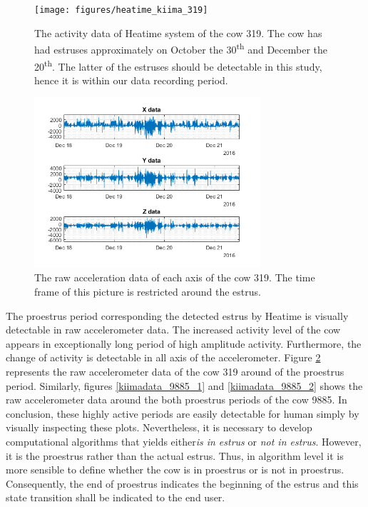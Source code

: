 \documentclass[english,12pt,a4paper,pdftex,elec,utf8]{aaltothesis}
\begin{document}
\begin{figure}[h]
\centering
\texttt{[image: figures/heatime\_kiima\_319]}
\caption{The activity data of Heatime system of the cow 319. The cow has had estruses approximately on October the 30\textsuperscript{th} and December the 20\textsuperscript{th}. The latter of the estruses should be detectable in this study, hence it is within our data recording period.}
\label{heatime_kiima_319}
\end{figure}

\begin{figure}[h]
\centering
\includegraphics[width = 0.75\textwidth]{figures/kiimadata_319.png}
\caption{The raw acceleration data of each axis of the cow 319. The time frame of this picture is restricted around the estrus.}
\label{kiimadata_319}
\end{figure}



The proestrus period corresponding the detected estrus by Heatime is visually detectable in raw accelerometer data. The increased activity level of the cow appears in exceptionally long period of high amplitude activity. Furthermore, the change of activity is detectable in all axis of the accelerometer. Figure \ref{kiimadata_319} represents the raw accelerometer data of the cow 319 around of the proestrus period. Similarly, figures \ref{kiimadata_9885_1} and \ref{kiimadata_9885_2} shows the raw accelerometer data around the both proestrus periods of the cow 9885. In conclusion, these highly active periods are easily detectable for human simply by visually inspecting these plots. Nevertheless, it is necessary to develop computational algorithms that yields either\textit{is in estrus} or \textit{not in estrus}. However, it is the proestrus rather than the actual estrus. Thus, in algorithm level it is more sensible to define whether the cow is in proestrus or is not in proestrus. Consequently, the end of proestrus indicates the beginning of the estrus and this state transition shall be indicated to the end user.
\end{document}
